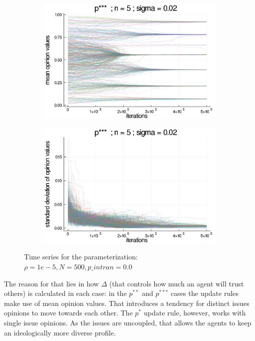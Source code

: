 \documentclass{article}
\begin{document}
\begin{figure}[H]
\begin{subfigure}[b]{0.48\textwidth}
        \includegraphics[width=\textwidth]{img/series/tseries5/Poodlcalculatep***n5-rho10e-5-sigma002-00intransrandom.png}
      \end{subfigure}
      \begin{subfigure}[b]{0.48\textwidth}
        \includegraphics[width=\textwidth]{img/series/tseries5/Poodlcalculatep***n5-rho10e-5-sigma002-00intransrandom-std.png}
      \end{subfigure}
      \caption{Time series for the parameterization: \(\rho = 1e-5, N =
        500, p\_intran = 0.0 \)}      
  \label{fig:tseries5}
    \end{figure}

    The reason for that lies in how \(\Delta\) (that controls how much an agent will trust others) is calculated in each case: in the \(p^{**}\)
    and \(p^{***}\) cases the update rules make use of mean opinion values. That introduces a tendency for distinct issues opinions to move towards each other. The \(p^{*}\) update rule, however, works with
    single issue opinions. As the issues are uncoupled, that allows the agents to keep an ideologically more diverse profile.
    
\end{document}
